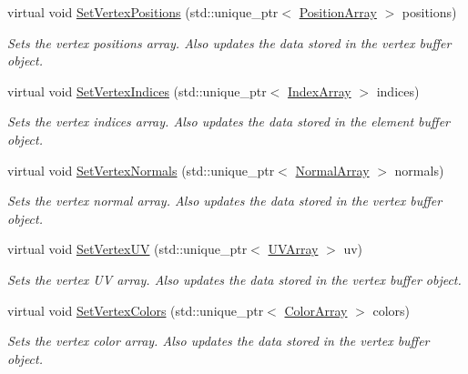 \begin{DoxyCompactItemize}
virtual void \hyperlink{class_rendering_object_ada51886b7da1924a17d3a55e8fe90061}{Set\+Vertex\+Positions} (std\+::unique\+\_\+ptr$<$ \hyperlink{class_rendering_object_a1223b9cf03f2029b9c43d71042c2a18e}{Position\+Array} $>$ positions)
\begin{DoxyCompactList}\small\item\em Sets the vertex positions array. Also updates the data stored in the vertex buffer object. \end{DoxyCompactList}\item 
virtual void \hyperlink{class_rendering_object_a61ea597df0c456834eac8eb4087fb573}{Set\+Vertex\+Indices} (std\+::unique\+\_\+ptr$<$ \hyperlink{class_rendering_object_a9931c88bca3384065c6691dfe1e60af1}{Index\+Array} $>$ indices)
\begin{DoxyCompactList}\small\item\em Sets the vertex indices array. Also updates the data stored in the element buffer object. \end{DoxyCompactList}\item 
virtual void \hyperlink{class_rendering_object_a4cd085aed01fbc5e4fae7076e00919d3}{Set\+Vertex\+Normals} (std\+::unique\+\_\+ptr$<$ \hyperlink{class_rendering_object_a327c4d892de8d6138fb59afa6d078257}{Normal\+Array} $>$ normals)
\begin{DoxyCompactList}\small\item\em Sets the vertex normal array. Also updates the data stored in the vertex buffer object. \end{DoxyCompactList}\item 
virtual void \hyperlink{class_rendering_object_a2a2b3c6ec2d13e8d3a4b6ac4c05ae11b}{Set\+Vertex\+UV} (std\+::unique\+\_\+ptr$<$ \hyperlink{class_rendering_object_a504ecd45ebe36dfa5b78c46d64d9904a}{U\+V\+Array} $>$ uv)
\begin{DoxyCompactList}\small\item\em Sets the vertex UV array. Also updates the data stored in the vertex buffer object. \end{DoxyCompactList}\item 
virtual void \hyperlink{class_rendering_object_aa1170c47ff02b2305a54c8aab3460201}{Set\+Vertex\+Colors} (std\+::unique\+\_\+ptr$<$ \hyperlink{class_rendering_object_a8a12e1f9be788d99af6c089e1c600022}{Color\+Array} $>$ colors)
\begin{DoxyCompactList}\small\item\em Sets the vertex color array. Also updates the data stored in the vertex buffer object. \end{DoxyCompactList}\item 

\end{DoxyCompactItemize}
